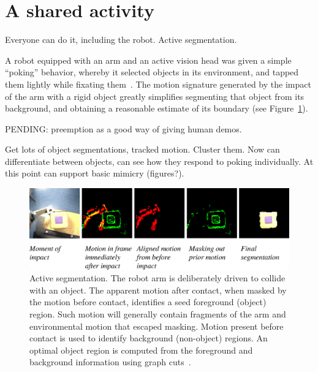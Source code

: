 \section{A shared activity}

Everyone can do it, including the robot.
Active segmentation.


A robot equipped with an arm and an active vision head was given a
simple
``poking'' behavior, whereby it selected objects in its environment,
and tapped them lightly while fixating them~\citep{fitzpatrick02towards}.
%
The motion signature generated by the impact of the arm with a rigid
object greatly simplifies segmenting that object from its background,
and obtaining a reasonable estimate of its
boundary (see Figure~\ref{fig:separate-simple}).

PENDING: preemption as a good way of giving human demos.



Get lots of object segmentations, tracked motion.  
Cluster them.  Now can differentiate between objects,
can see how they respond to poking individually.
%
At this point can support basic mimicry (figures?).



\begin{figure}[bt]
\includegraphics[width=\columnwidth]{fig-separate-simple}
\caption
{
\label{fig:separate-simple}
%
Active segmentation.  The robot arm is deliberately driven
to collide with an object.
 The
apparent motion after contact, when masked by the motion before
contact, identifies a seed foreground (object) region.  Such motion
will generally contain fragments of the arm and environmental motion
that escaped masking.  Motion present before contact is used to
identify background (non-object) regions.  
An optimal object region is computed from the foreground and
background information using graph cuts~\citep{fitzpatrick03first}.
%
%
}
\end{figure}




